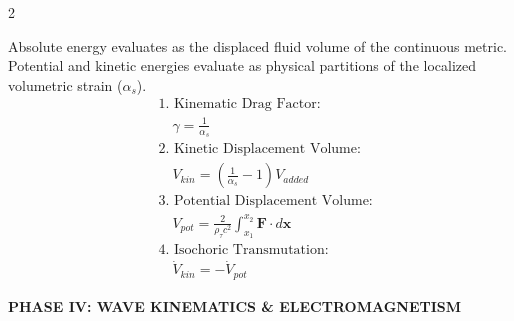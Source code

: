 \documentclass[11pt, a4paper]{article}
\newcounter{cheatnum}
\begin{document}
\begin{multicols}{2}
\begin{tcolorbox}[cheatbox, title={\refstepcounter{cheatnum}\label{box:volumetric_energy}\thecheatnum. Kinetic-Potential Strain Conservation \scriptsize\hfill\hyperref[sec:deriv_volumetric_energy]{[Proof $\downarrow$]}}]
Absolute energy evaluates as the displaced fluid volume of the continuous metric. Potential and kinetic energies evaluate as physical partitions of the localized volumetric strain ($\alpha_s$).
\begin{align}
    &\text{1. Kinematic Drag Factor:} \nonumber \\
    &\quad \gamma = \frac{1}{\alpha_s} \label{eq:strain_lorentz} \\
    &\text{2. Kinetic Displacement Volume:} \nonumber \\
    &\quad V_{kin} = \left( \frac{1}{\alpha_s} - 1 \right) V_{added} \label{eq:kinetic_volume} \\
    &\text{3. Potential Displacement Volume:} \nonumber \\
    &\quad V_{pot} = \frac{2}{\rho_{\tau} c^2} \int_{x_1}^{x_2} \mathbf{F} \cdot d\mathbf{x} \label{eq:potential_volume} \\
    &\text{4. Isochoric Transmutation:} \nonumber \\
    &\quad \dot{V}_{kin} = -\dot{V}_{pot} \label{eq:isochoric_transmutation}
\end{align}
\end{tcolorbox}

\newpage
\vspace{0.4cm}
\noindent\textbf{\large \color{academiabrown} PHASE IV: WAVE KINEMATICS \& ELECTROMAGNETISM}
\vspace{0.2cm}


\end{multicols}
\end{document}
